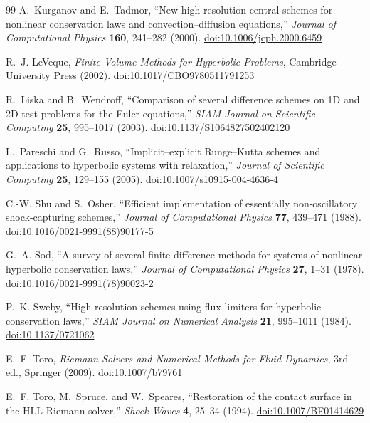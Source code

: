 \documentclass[11pt]{article}
\begin{document}
\begin{thebibliography}{99}
A.~Kurganov and E.~Tadmor, ``New high-resolution central schemes for nonlinear conservation
laws and convection--diffusion equations,'' \emph{Journal of Computational Physics}
\textbf{160}, 241--282 (2000).
\href{https://doi.org/10.1006/jcph.2000.6459}{doi:10.1006/jcph.2000.6459}

R.~J. LeVeque, \emph{Finite Volume Methods for Hyperbolic Problems}, Cambridge University
Press (2002).
\href{https://doi.org/10.1017/CBO9780511791253}{doi:10.1017/CBO9780511791253}

R.~Liska and B.~Wendroff, ``Comparison of several difference schemes on 1D and 2D test
problems for the Euler equations,'' \emph{SIAM Journal on Scientific Computing}
\textbf{25}, 995--1017 (2003).
\href{https://doi.org/10.1137/S1064827502402120}{doi:10.1137/S1064827502402120}

L.~Pareschi and G.~Russo, ``Implicit--explicit Runge--Kutta schemes and applications to
hyperbolic systems with relaxation,'' \emph{Journal of Scientific Computing} \textbf{25},
129--155 (2005).
\href{https://doi.org/10.1007/s10915-004-4636-4}{doi:10.1007/s10915-004-4636-4}

C.-W. Shu and S.~Osher, ``Efficient implementation of essentially non-oscillatory
shock-capturing schemes,'' \emph{Journal of Computational Physics} \textbf{77}, 439--471
(1988).
\href{https://doi.org/10.1016/0021-9991(88)90177-5}{doi:10.1016/0021-9991(88)90177-5}

G.~A. Sod, ``A survey of several finite difference methods for systems of nonlinear
hyperbolic conservation laws,'' \emph{Journal of Computational Physics} \textbf{27}, 1--31
(1978).
\href{https://doi.org/10.1016/0021-9991(78)90023-2}{doi:10.1016/0021-9991(78)90023-2}

P.~K. Sweby, ``High resolution schemes using flux limiters for hyperbolic conservation
laws,'' \emph{SIAM Journal on Numerical Analysis} \textbf{21}, 995--1011 (1984).
\href{https://doi.org/10.1137/0721062}{doi:10.1137/0721062}

E.~F. Toro, \emph{Riemann Solvers and Numerical Methods for Fluid Dynamics}, 3rd ed.,
Springer (2009).
\href{https://doi.org/10.1007/b79761}{doi:10.1007/b79761}

E.~F. Toro, M.~Spruce, and W.~Speares, ``Restoration of the contact surface in the
HLL-Riemann solver,'' \emph{Shock Waves} \textbf{4}, 25--34 (1994).
\href{https://doi.org/10.1007/BF01414629}{doi:10.1007/BF01414629}


\end{thebibliography}
\end{document}

